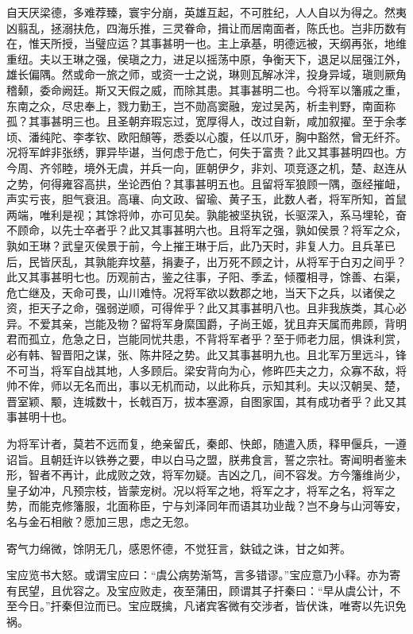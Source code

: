 \documentclass[]{article}
\begin{document}
自天厌梁德，多难荐臻，寰宇分崩，英雄互起，不可胜纪，人人自以为得之。然夷凶翦乱，拯溺扶危，四海乐推，三灵眷命，揖让而居南面者，陈氏也。岂非历数有在，惟天所授，当璧应运？其事甚明一也。主上承基，明德远被，天纲再张，地维重纽。夫以王琳之强，侯瑱之力，进足以摇荡中原，争衡天下，退足以屈强江外，雄长偏隅。然或命一旅之师，或资一士之说，琳则瓦解冰泮，投身异域，瑱则厥角稽颡，委命阙廷。斯又天假之威，而除其患。其事甚明二也。今将军以籓戚之重，东南之众，尽忠奉上，戮力勤王，岂不勋高窦融，宠过吴芮，析圭判野，南面称孤？其事甚明三也。且圣朝弃瑕忘过，宽厚得人，改过自新，咸加叙擢。至于余孝顷、潘纯陀、李孝钦、欧阳頠等，悉委以心腹，任以爪牙，胸中豁然，曾无纤芥。况将军衅非张绣，罪异毕谌，当何虑于危亡，何失于富贵？此又其事甚明四也。方今周、齐邻睦，境外无虞，并兵一向，匪朝伊夕，非刘、项竞逐之机，楚、赵连从之势，何得雍容高拱，坐论西伯？其事甚明五也。且留将军狼顾一隅，亟经摧衄，声实亏丧，胆气衰沮。高瓖、向文政、留瑜、黄子玉，此数人者，将军所知，首鼠两端，唯利是视；其馀将帅，亦可见矣。孰能被坚执锐，长驱深入，系马埋轮，奋不顾命，以先士卒者乎？此又其事甚明六也。且将军之强，孰如侯景？将军之众，孰如王琳？武皇灭侯景于前，今上摧王琳于后，此乃天时，非复人力。且兵革已后，民皆厌乱，其孰能弃坟墓，捐妻子，出万死不顾之计，从将军于白刃之间乎？此又其事甚明七也。历观前古，鉴之往事，子阳、季孟，倾覆相寻，馀善、右渠，危亡继及，天命可畏，山川难恃。况将军欲以数郡之地，当天下之兵，以诸侯之资，拒天子之命，强弱逆顺，可得侔乎？此又其事甚明八也。且非我族类，其心必异。不爱其亲，岂能及物？留将军身縻国爵，子尚王姬，犹且弃天属而弗顾，背明君而孤立，危急之日，岂能同忧共患，不背将军者乎？至于师老力屈，惧诛利赏，必有韩、智晋阳之谋，张、陈井陉之势。此又其事甚明九也。且北军万里远斗，锋不可当，将军自战其地，人多顾后。梁安背向为心，修旿匹夫之力，众寡不敌，将帅不侔，师以无名而出，事以无机而动，以此称兵，示知其利。夫以汉朝吴、楚，晋室颖、颙，连城数十，长戟百万，拔本塞源，自图家国，其有成功者乎？此又其事甚明十也。

为将军计者，莫若不远而复，绝亲留氏，秦郎、快郎，随遣入质，释甲偃兵，一遵诏旨。且朝廷许以铁券之要，申以白马之盟，朕弗食言，誓之宗社。寄闻明者鉴未形，智者不再计，此成败之效，将军勿疑。吉凶之几，间不容发。方今籓维尚少，皇子幼冲，凡预宗枝，皆蒙宠树。况以将军之地，将军之才，将军之名，将军之势，而能克修籓服，北面称臣，宁与刘泽同年而语其功业哉？岂不身与山河等安，名与金石相敝？愿加三思，虑之无忽。

寄气力绵微，馀阴无几，感恩怀德，不觉狂言，鈇钺之诛，甘之如荠。

宝应览书大怒。或谓宝应曰：``虞公病势渐笃，言多错谬。''宝应意乃小释。亦为寄有民望，且优容之。及宝应败走，夜至蒲田，顾谓其子扞秦曰：``早从虞公计，不至今日。''扞秦但泣而已。宝应既擒，凡诸宾客微有交涉者，皆伏诛，唯寄以先识免祸。
\end{document}
